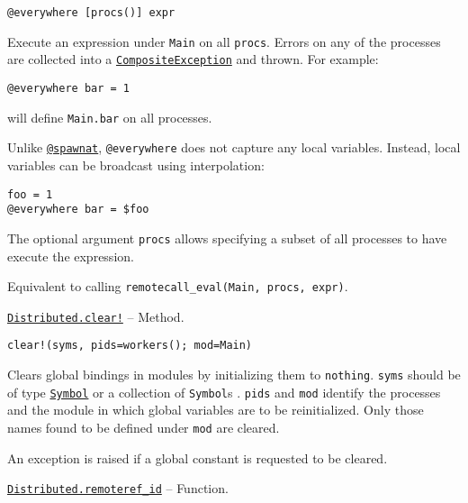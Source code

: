 \begin{adjustwidth}{2em}{0pt}


\begin{verbatim}
@everywhere [procs()] expr
\end{verbatim}

Execute an expression under \texttt{Main} on all \texttt{procs}. Errors on any of the processes are collected into a \hyperlink{15047752250898038281}{\texttt{CompositeException}} and thrown. For example:


\begin{lstlisting}
@everywhere bar = 1
\end{lstlisting}

will define \texttt{Main.bar} on all processes.

Unlike \hyperlink{11231712027010946923}{\texttt{@spawnat}}, \texttt{@everywhere} does not capture any local variables. Instead, local variables can be broadcast using interpolation:


\begin{lstlisting}
foo = 1
@everywhere bar = $foo
\end{lstlisting}

The optional argument \texttt{procs} allows specifying a subset of all processes to have execute the expression.

Equivalent to calling \texttt{remotecall\_eval(Main, procs, expr)}.



\end{adjustwidth}
\hypertarget{13290730966976452315}{} 
\hyperlink{13290730966976452315}{\texttt{Distributed.clear!}}  -- {Method.}

\begin{adjustwidth}{2em}{0pt}


\begin{verbatim}
clear!(syms, pids=workers(); mod=Main)
\end{verbatim}

Clears global bindings in modules by initializing them to \texttt{nothing}. \texttt{syms} should be of type \hyperlink{18332791376992528422}{\texttt{Symbol}} or a collection of \texttt{Symbol}s . \texttt{pids} and \texttt{mod} identify the processes and the module in which global variables are to be reinitialized. Only those names found to be defined under \texttt{mod} are cleared.

An exception is raised if a global constant is requested to be cleared.



\end{adjustwidth}
\hypertarget{10046899291571146856}{} 
\hyperlink{10046899291571146856}{\texttt{Distributed.remoteref\_id}}  -- {Function.}

